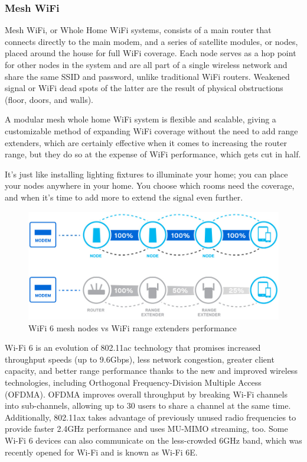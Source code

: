 			\subsubsection{Mesh WiFi}
					
				Mesh WiFi, or Whole Home WiFi systems, consists of a main router that connects directly to the main modem, and a series of satellite modules, or nodes, placed around the house for full WiFi coverage.
				Each node serves as a hop point for other nodes in the system and are all part of a single wireless network and share the same SSID and password, unlike traditional WiFi routers.
				Weakened signal or WiFi dead spots of the latter are the result of physical obstructions (floor, doors, and walls).
				
				A modular mesh whole home WiFi system is flexible and scalable, giving a customizable method of expanding WiFi coverage without the need to add range extenders, which are certainly effective when it comes to increasing the router range, but they do so at the expense of WiFi performance, which gets cut in half.
				
				It’s just like installing lighting fixtures to illuminate your home; you can place your nodes anywhere in your home. You choose which rooms need the coverage, and when it’s time to add more to extend the signal even further. 				
			
				\begin{figure}
					\centering
					\includegraphics[width=\textwidth]{resources/img/chap4/wifi6}
					\caption{WiFi 6 mesh nodes vs WiFi range extenders performance}
					\label{img:wifi6}
				\end{figure}
				
				Wi-Fi 6 is an evolution of 802.11ac technology that promises increased throughput speeds (up to 9.6Gbps), less network congestion, greater client capacity, and better range performance thanks to the new and improved wireless technologies, including Orthogonal Frequency-Division Multiple Access (OFDMA). OFDMA improves overall throughput by breaking Wi-Fi channels into sub-channels, allowing up to 30 users to share a channel at the same time. Additionally, 802.11ax takes advantage of previously unused radio frequencies to provide faster 2.4GHz performance and uses MU-MIMO streaming, too. Some Wi-Fi 6 devices can also communicate on the less-crowded 6GHz band, which was recently opened for Wi-Fi and is known as Wi-Fi 6E.
				
